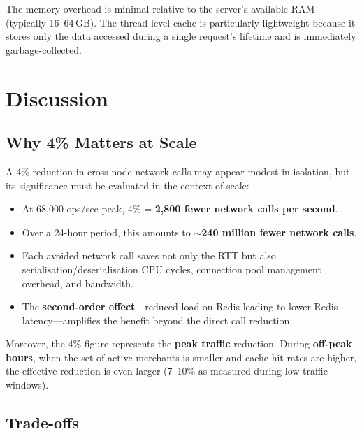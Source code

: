 \documentclass[12pt,a4paper]{report}
\begin{document}
The memory overhead is minimal relative to the server's available RAM (typically 16–64\,GB). The thread-level cache is particularly lightweight because it stores only the data accessed during a single request's lifetime and is immediately garbage-collected.


\chapter{Discussion}

\section{Why 4\% Matters at Scale}

A 4\% reduction in cross-node network calls may appear modest in isolation, but its significance must be evaluated in the context of scale:

\begin{itemize}
    \item At 68,000 ops/sec peak, 4\% = \textbf{2,800 fewer network calls per second}.
    \item Over a 24-hour period, this amounts to \textbf{$\sim$240 million fewer network calls}.
    \item Each avoided network call saves not only the RTT but also serialisation/deserialisation CPU cycles, connection pool management overhead, and bandwidth.
    \item The \textbf{second-order effect}—reduced load on Redis leading to lower Redis latency—amplifies the benefit beyond the direct call reduction.
\end{itemize}

Moreover, the 4\% figure represents the \textbf{peak traffic} reduction. During \textbf{off-peak hours}, when the set of active merchants is smaller and cache hit rates are higher, the effective reduction is even larger (7–10\% as measured during low-traffic windows).

\section{Trade-offs}
\end{document}
